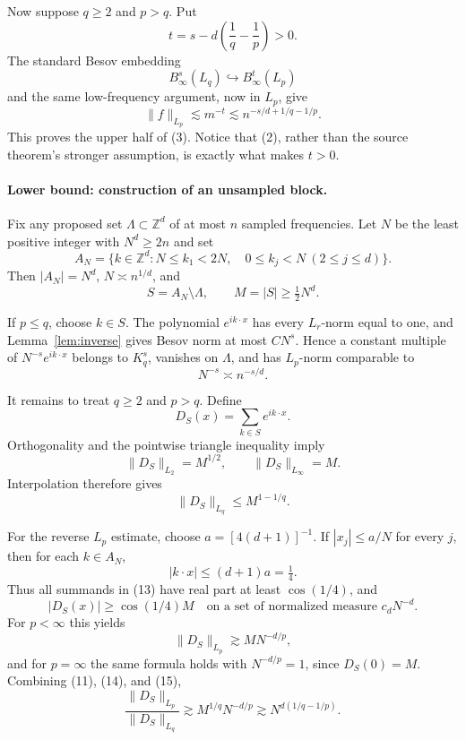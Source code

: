\documentclass[11pt]{article}
\newcommand{\Z}{\mathbb Z}
\begin{document}
Now suppose \(q\geq2\) and \(p>q\).  Put
\[
                  t=s-d\left(\frac1q-\frac1p\right)>0.
\]
The standard Besov embedding
\[
 B^s_\infty(L_q)\hookrightarrow B^t_\infty(L_p)                 \tag{8}
\]
and the same low-frequency argument, now in \(L_p\), give
\[
 \|f\|_{L_p}\lesssim m^{-t}
 \lesssim n^{-s/d+1/q-1/p}.                                    \tag{9}
\]
This proves the upper half of (3).  Notice that (2), rather than the
source theorem's stronger assumption, is exactly what makes \(t>0\).

\paragraph{Lower bound: construction of an unsampled block.}
Fix any proposed set \(\Lambda\subset\Z^d\) of at most \(n\) sampled
frequencies.  Let \(N\) be the least positive integer with \(N^d\geq2n\)
and set
\[
 A_N=\{k\in\Z^d:N\leq k_1<2N,\quad 0\leq k_j<N\ (2\leq j\leq d)\}.
                                                                    \tag{10}
\]
Then \(|A_N|=N^d\), \(N\asymp n^{1/d}\), and
\[
 S=A_N\setminus\Lambda,\qquad M=|S|\geq\tfrac12N^d.              \tag{11}
\]

If \(p\leq q\), choose \(k\in S\).  The polynomial \(e^{ik\cdot x}\)
has every \(L_r\)-norm equal to one, and Lemma~\ref{lem:inverse} gives
Besov norm at most \(CN^s\).  Hence a constant multiple of
\(N^{-s}e^{ik\cdot x}\) belongs to \(K_q^s\), vanishes on \(\Lambda\),
and has \(L_p\)-norm comparable to
\[
                         N^{-s}\asymp n^{-s/d}.                  \tag{12}
\]

It remains to treat \(q\geq2\) and \(p>q\).  Define
\[
                         D_S(x)=\sum_{k\in S}e^{ik\cdot x}.       \tag{13}
\]
Orthogonality and the pointwise triangle inequality imply
\[
 \|D_S\|_{L_2}=M^{1/2},\qquad \|D_S\|_{L_\infty}=M.
\]
Interpolation therefore gives
\[
                         \|D_S\|_{L_q}\leq M^{1-1/q}.            \tag{14}
\]

For the reverse \(L_p\) estimate, choose
\(a=[4(d+1)]^{-1}\).  If \(|x_j|\leq a/N\) for every \(j\), then for
each \(k\in A_N\),
\[
 |k\cdot x|\leq(d+1)a=\tfrac14.
\]
Thus all summands in (13) have real part at least \(\cos(1/4)\), and
\[
 |D_S(x)|\geq \cos(1/4)M
 \quad\text{on a set of normalized measure }c_dN^{-d}.
\]
For \(p<\infty\) this yields
\[
                         \|D_S\|_{L_p}\gtrsim MN^{-d/p},         \tag{15}
\]
and for \(p=\infty\) the same formula holds with \(N^{-d/p}=1\),
since \(D_S(0)=M\).  Combining (11), (14), and (15),
\[
 \frac{\|D_S\|_{L_p}}{\|D_S\|_{L_q}}
 \gtrsim M^{1/q}N^{-d/p}
 \gtrsim N^{d(1/q-1/p)}.                                       \tag{16}
\]
\end{document}
